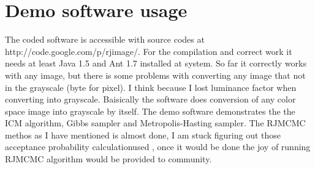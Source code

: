 \documentclass[journal]{IEEEtran}
\begin{document}
\section{Demo software usage}
The coded software is accessible with source codes at http://code.google.com/p/rjimage/. For the compilation and correct work it needs at least Java 1.5 and Ant 1.7 installed at system. So far it correctly works with any image, but there is some problems with converting any image that not in the grayscale (byte for pixel). I think because I lost luminance factor when converting into grayscale. Baisically the software does conversion of any color space image into grayscale by itself. The demo software demonstrates the the ICM algorithm, Gibbs sampler and Metropolis-Hasting sampler. The RJMCMC methos as I have mentioned is almost done, I am stuck figuring out those acceptance probability calculationused , once it would be done the joy of running RJMCMC algorithm would be provided to community.




\end{document}

